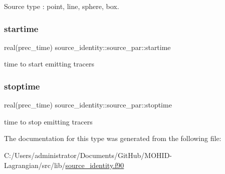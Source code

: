 Source type \+: \textquotesingle{}point\textquotesingle{}, \textquotesingle{}line\textquotesingle{}, \textquotesingle{}sphere\textquotesingle{}, \textquotesingle{}box\textquotesingle{}. 

\mbox{\label{structsource__identity_1_1source__par_a11cd864db9e9021cec4bd018d6fec295}} 
\subsubsection{\texorpdfstring{startime}{startime}}
{\footnotesize\ttfamily real(prec\+\_\+time) source\+\_\+identity\+::source\+\_\+par\+::startime\hspace{0.3cm}{\ttfamily [private]}}



time to start emitting tracers 

\mbox{\label{structsource__identity_1_1source__par_a3ab5e22242b41bdcd56480b9d0496efa}} 
\subsubsection{\texorpdfstring{stoptime}{stoptime}}
{\footnotesize\ttfamily real(prec\+\_\+time) source\+\_\+identity\+::source\+\_\+par\+::stoptime\hspace{0.3cm}{\ttfamily [private]}}



time to stop emitting tracers 



The documentation for this type was generated from the following file\+:\begin{DoxyCompactItemize}
\item 
C\+:/\+Users/administrator/\+Documents/\+Git\+Hub/\+M\+O\+H\+I\+D-\/\+Lagrangian/src/lib/\mbox{\hyperlink{source__identity_8f90}{source\+\_\+identity.\+f90}}\end{DoxyCompactItemize}
